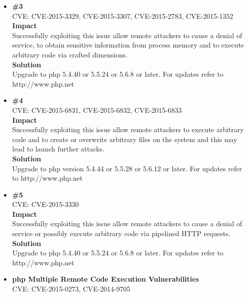 \begin{itemize}
\item \textbf{\#3} \\
CVE:	CVE-2015-3329, CVE-2015-3307, CVE-2015-2783, CVE-2015-1352\\

\textbf{Impact} \\
Successfully exploiting this issue allow remote attackers to cause a denial of service, to obtain sensitive information from process memory and to execute arbitrary code via crafted dimensions.\\


\textbf{Solution}\\
Upgrade to php 5.4.40 or 5.5.24 or 5.6.8 or later. For updates refer to http://www.php.net\\


\item \textbf{\#4} \\
CVE:	CVE-2015-6831, CVE-2015-6832, CVE-2015-6833\\

\textbf{Impact} \\
Successfully exploiting this issue allow remote attackers to execute arbitrary code and to create or overwrite arbitrary files on the system and this may lead to launch further attacks.\\

\textbf{Solution}\\
Upgrade to php version 5.4.44 or 5.5.28 or 5.6.12 or later. For updates refer to http://www.php.net\\

\item \textbf{\#5} \\
CVE: CVE-2015-3330\\

\textbf{Impact} \\
Successfully exploiting this issue allow remote attackers to cause a denial of service or possibly execute arbitrary code via pipelined HTTP requests.\\


\textbf{Solution}\\
Upgrade to php 5.4.40 or 5.5.24 or 5.6.8 or later. For updates refer to http://www.php.net\\

\item \textbf{php Multiple Remote Code Execution Vulnerabilities} \\
CVE: CVE-2015-0273, CVE-2014-9705 \\


\end{itemize}
